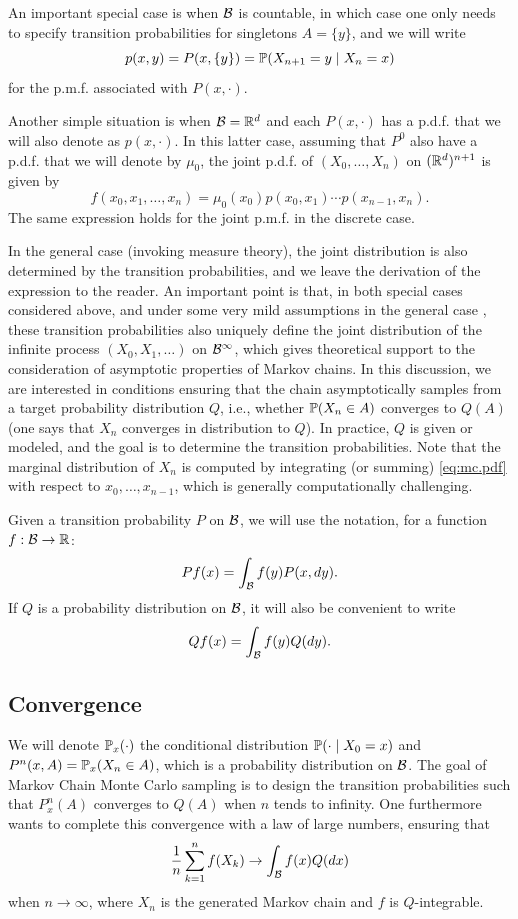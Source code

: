 An important special case is when ${\mathcal B}$ is countable, in which case one only needs to specify transition probabilities for singletons $A = \{y\}$, and we will write
\[
p(x, y) = P(x, \{y\}) = \bm{\mathbb P}(X_{n+1} =y \mid X_n =  x)
\]
for the p.m.f. associated with $P(x, \cdot)$.

Another simple situation is when ${\mathcal B} = {\mathbb{R}}^d$ and each $P(x, \cdot)$ has a p.d.f. that we will also denote as $p(x, \cdot)$. In this latter case, assuming that $P^0$ also have a p.d.f. that we will denote by $\mu_0$, the joint p.d.f. of $(X_0, \ldots, X_n)$ on $({\mathbb{R}}^d)^{n+1}$ is given by
\begin{equation}
\label{eq:mc.pdf}
f(x_0, x_1, \ldots, x_n) =  \mu_0(x_0) p(x_0, x_1)\cdots p(x_{n-1}, x_n).
\end{equation}
The same expression holds for the joint p.m.f. in the discrete case.

In the general case (invoking measure theory), the joint distribution is also determined by the transition probabilities, and we leave the derivation of  the expression to the reader. An important point is that, in both special cases considered above, and under some very mild assumptions in the general case , these transition probabilities also uniquely define the joint distribution of the infinite process $(X_0, X_1, \ldots)$ on ${\mathcal B}^\infty$, which gives theoretical support to the consideration of asymptotic properties of Markov chains. In this discussion, we are interested in conditions ensuring that the chain asymptotically samples from a target probability distribution $Q$, i.e., whether $\bm{\mathbb P}(X_n \in A)$ converges to $Q(A)$ (one says that $X_n$ converges in distribution to $Q$). In practice, $Q$ is given or modeled, and the goal is to determine the transition probabilities.
Note that the marginal distribution of $X_n$ is computed by integrating (or summing) \cref{eq:mc.pdf} with respect to $x_0, \ldots, x_{n-1}$, which is generally computationally challenging. 

Given a transition probability $P$ on ${\mathcal B}$, we will use the notation, for a function $f:{\mathcal B} \to {\mathbb{R}}$:
\[
Pf(x) = \int_{\mathcal B} f(y) P(x, dy).
\]
If $Q$ is a probability distribution on ${\mathcal B}$, it will also be convenient to write
\[
Qf(x) = \int_{\mathcal B} f(y) Q(dy).
\]

\subsection{Convergence}
We will denote $\bm{\mathbb P}_x(\cdot)$ the conditional distribution $\bm{\mathbb P}(\cdot \mid X_0 = x)$ and $P^n(x, A) = \bm{\mathbb P}_x(X_n\in A)$, which is a probability distribution on ${\mathcal B}$. The goal of Markov Chain Monte Carlo sampling is to design the transition probabilities such that $P^n_{x}(A)$ converges to $Q(A)$ when $n$ tends to infinity. One furthermore wants to complete this convergence with a law of large numbers, ensuring that
\[
\frac1 n\sum_{k=1}^n f(X_k)\to \int_{{\mathcal B}} f(x) Q(dx)
\] 
when $n\to \infty$, where $X_n$ is the generated Markov chain and $f$ is $Q$-integrable.

